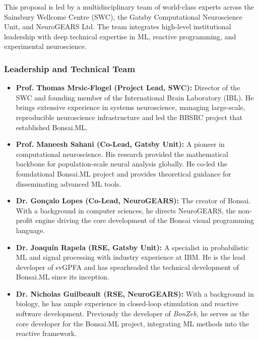 This proposal is led by a multidisciplinary team of world-class experts across
the Sainsbury Wellcome Centre (SWC), the Gatsby Computational Neuroscience
Unit, and NeuroGEARS Ltd. The team integrates high-level institutional
leadership with deep technical expertise in ML, reactive programming, and
experimental neuroscience.

\subsubsection{Leadership and Technical Team}

\begin{itemize}

    \item \textbf{Prof. Thomas Mrsic-Flogel (Project Lead, SWC):} Director of
        the SWC and founding member of the International Brain Laboratory
        (IBL). He brings extensive experience in systems neuroscience, managing
        large-scale, reproducible neuroscience infrastructure and led the BBSRC
        project that established Bonsai.ML.

    \item \textbf{Prof. Maneesh Sahani (Co-Lead, Gatsby Unit):} A pioneer in
        computational neuroscience. His research provided the mathematical
        backbone for population-scale neural analysis globally. He co-led the
        foundational Bonsai.ML project and provides theoretical guidance for
        disseminating advanced ML tools.

    \item \textbf{Dr. Gonçalo Lopes (Co-Lead, NeuroGEARS):} The creator of
        Bonsai. With a background in computer sciences, he directs NeuroGEARS,
        the non-profit engine driving the core development of the Bonsai visual
        programming language.

    \item \textbf{Dr. Joaquín Rapela (RSE, Gatsby Unit):} A specialist in
        probabilistic ML and signal processing with industry experience at IBM.
        He is the lead developer of svGPFA and has spearheaded the technical
        development of Bonsai.ML since its inception.

    \item \textbf{Dr. Nicholas Guilbeault (RSE, NeuroGEARS):} With a background
        in biology, he has ample experience in closed-loop stimulation and
        reactive software development. Previously the developer of
        \textit{BonZeb}, he serves as the core developer for the Bonsai.ML
        project, integrating ML methods into the reactive framework.
\end{itemize}

